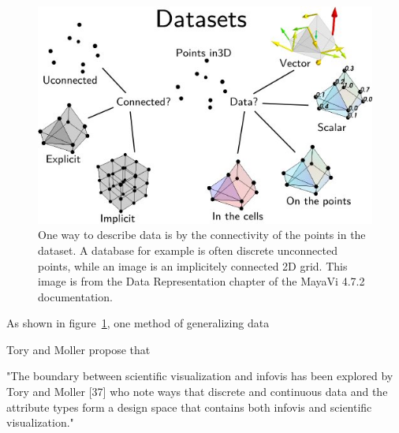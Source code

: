 \documentclass[../main.tex]{subfiles}
\begin{document}
\begin{figure}
    \includegraphics[width=1\textwidth]{figures/intro/dataset_diagram.png}
    \caption{One way to describe data is by the connectivity of the points in the dataset. A database for example is often discrete unconnected points, while an image is an implicitely connected 2D grid. This image is from the Data Representation chapter of the MayaVi 4.7.2 documentation.\cite{DataRepresentationMayavi}}
    \label{fig:intro_data_format}
\end{figure}

As shown in figure~\ref{fig:intro_data_format}, one method of generalizing data 





Tory and Moller propose that 



"The boundary between scientific visualization and infovis has been explored by Tory and Moller [37] who note ways that discrete and continuous data and the attribute types form a design space that contains both infovis and scientific visualization." \cite{pousmanCasualInformation2007}
\end{document}
